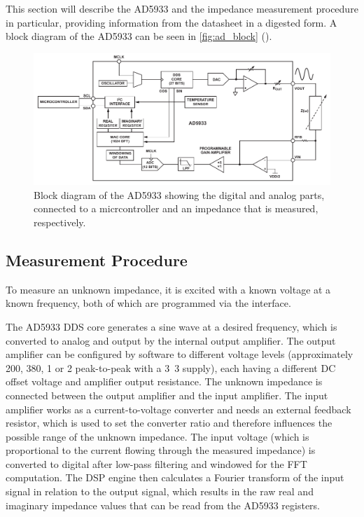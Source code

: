 This section will describe the AD5933 and the impedance measurement procedure in particular, providing information
from the datasheet\footnotemark{} in a digested form.
A block diagram of the AD5933 can be seen in \autoref{fig:ad_block} ().

\begin{figure}[htpb]
  \centering
    \includegraphics[width=\textwidth]{bilder/ad_block.pdf}
  \caption{Block diagram of the AD5933 showing the digital and analog parts, connected to a micrcontroller
    and an impedance that is measured, respectively.}
  \label{fig:ad_block}
\end{figure}


\subsection{Measurement Procedure} \label{sec:ad5933_proc}

To measure an unknown impedance, it is excited with a known voltage at a known frequency, both of which are programmed
via the \iic{} interface.

The AD5933 DDS core generates a sine wave at a desired frequency, which is converted to analog and output by the
internal output amplifier. The output amplifier can be configured by software to different voltage levels
(approximately \unit{200}{\milli\volt}, \unit{380}{\milli\volt}, \unit{1}{\volt} or \unit{2}{\volt} peak-to-peak with
a \unit{3.3}{\volt} supply), each having a different DC offset voltage and amplifier output resistance.
The unknown impedance is connected between the output amplifier and the input amplifier. The input amplifier works as
a current-to-voltage converter and needs an external feedback resistor, which is used to set the converter ratio
and therefore influences the possible range of the unknown impedance.
The input voltage (which is proportional to the current flowing through the measured impedance) is converted to digital
after low-pass filtering and windowed for the FFT computation.
The DSP engine then calculates a Fourier transform of the input signal in relation to the output signal,
which results in the raw real and imaginary impedance values that can be read from the AD5933 registers.


